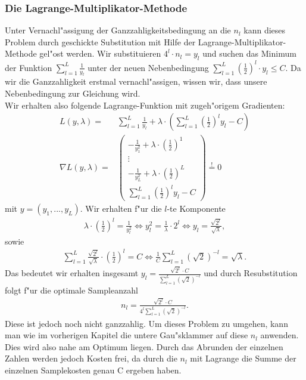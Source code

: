 \subsubsection{Die Lagrange-Multiplikator-Methode}
Unter Vernachl"assigung der Ganzzahligkeitsbedingung an die $n_l$ kann dieses Problem durch geschickte Substitution mit Hilfe der Lagrange-Multiplikator-Methode gel"ost werden.
Wir substituieren $4^l\cdot n_l= y_l$ und suchen das Minimum der Funktion $\sum_{l=1}^L \frac{1}{y_l}$ unter der neuen  Nebenbedingung  $\sum_{l=1}^L \left(\frac{1}{2}\right)^l \cdot y_l \leq C$. Da wir die Ganzzahligkeit erstmal vernachl"assigen, wissen wir, dass unsere Nebenbedingung zur Gleichung wird.\\
Wir erhalten also folgende Lagrange-Funktion mit zugeh"origem Gradienten:
\begin{align*}
L(y,\lambda)=&\sum_{l=1}^L \frac{1}{y_l}+\lambda\cdot \left(\sum_{l=1}^L\left(\frac{1}{2}\right)^ly_l-C \right)\\
\nabla L(y,\lambda)=&\begin{pmatrix}
-\frac{1}{y_1^2}+\lambda\cdot \left(\frac{1}{2}\right)^1\\
\vdots\\
-\frac{1}{y_L^2}+\lambda\cdot \left(\frac{1}{2}\right)^L\\
\sum_{l=1}^L \left(\frac{1}{2}\right)^ly_l-C
\end{pmatrix}\overset{!}{=}0
\end{align*} mit $y=(y_1,...,y_L)$.
Wir erhalten f"ur die $l$-te Komponente
\begin{align*}
\lambda\cdot \left(\frac{1}{2}\right)^l=\frac{1}{y_l^2} \Leftrightarrow y_l^2=\frac{1}{\lambda}\cdot 2^l \Leftrightarrow y_l=\frac{\sqrt{2^l}}{\sqrt{\lambda}},
\end{align*}
sowie
\begin{align*}
\sum_{l=1}^L   \frac{\sqrt{2^l}}{\sqrt{\lambda}} \cdot\left(\frac{1}{2}\right)^l=C\Leftrightarrow \frac{1}{C}\sum_{l=1}^L (\sqrt{2})^{-l}=\sqrt{\lambda}.
\end{align*}
Das bedeutet wir erhalten insgesamt $y_l=\frac{\sqrt{2^l}\cdot C}{\sum_{l=1}^L(\sqrt{2})^{-l}}$ und durch Resubstitution folgt f"ur die optimale Sampleanzahl
\begin{align*}
n_l=\frac{\sqrt{2^l}\cdot C}{4^l\sum_{l=1}^L(\sqrt{2})^{-l}}.
\end{align*}
Diese ist jedoch noch nicht ganzzahlig. Um dieses Problem zu umgehen, kann man wie im vorherigen Kapitel die untere Gau"sklammer auf diese $n_l$ anwenden. Dies wird also nahe am Optimum liegen. Durch das Abrunden der einzelnen Zahlen werden jedoch Kosten frei, da durch die $n_l$ mit Lagrange die Summe der einzelnen Samplekosten genau C ergeben haben.\\
